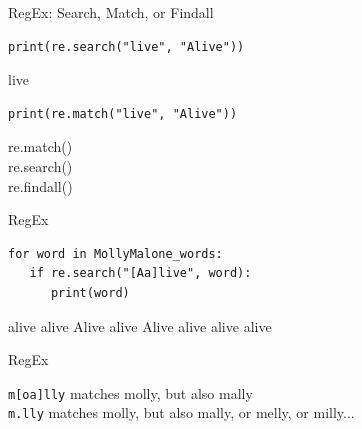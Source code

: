 \documentclass[handout]{beamer}
\begin{document}
\begin{frame}[fragile]{RegEx: Search, Match, or Findall}
	
\begin{lstlisting}
print(re.search("live", "Alive"))
\end{lstlisting}
	
\begin{lstlistingoutput}
live
\end{lstlistingoutput}

\begin{lstlisting}
print(re.match("live", "Alive"))
\end{lstlisting}

\begin{lstlistingoutput}
 
\end{lstlistingoutput}


re.match() \\
re.search() \\
re.findall()

	
\end{frame}



\begin{frame}[fragile]{RegEx}

\begin{lstlisting}
for word in MollyMalone_words:
   if re.search("[Aa]live", word):
      print(word)
\end{lstlisting}
	
\begin{lstlistingoutput}
alive
alive
Alive
alive
Alive
alive
alive
alive
\end{lstlistingoutput}
	
	
\end{frame}



\begin{frame}[fragile]{RegEx}

\lstinline{m[oa]lly} matches molly, but also mally \\
\lstinline{m.lly} matches molly, but also mally, or melly, or milly...

	
	
\end{frame}
\end{document}
